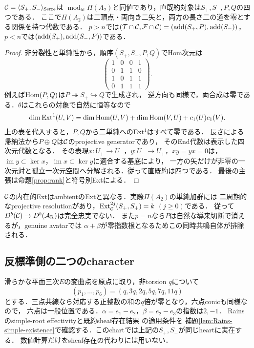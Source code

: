 \begin{proposition}[二根の全有限長対象]\label{prop:A2category}
$\mathcal C=\langle S_+,S_-\rangle_{\mathrm{Serre}}$は
$\operatorname{mod}_{\mathrm{fd}}\Pi(A_2)$と同値であり，直既約対象は$S_+,S_-,P,Q$の四つである．
ここで$\Pi(A_2)$は二頂点・両向き二矢と，両方の長さ二の道を零とする関係を持つ代数である．
$p>n$では$(\mathcal T\cap\mathcal C,\mathcal F\cap\mathcal C)=(\operatorname{add}(S_+,P),\operatorname{add}(S_-))$，
$p<n$では$(\operatorname{add}(S_+),\operatorname{add}(S_-,P))$である．
\end{proposition}
\begin{proof}
非分裂性と単純性から，順序$(S_+,S_-,P,Q)$でHom次元は
\[
\begin{pmatrix}
1&0&0&1\\0&1&1&0\\1&0&1&1\\0&1&1&1
\end{pmatrix}.
\]
例えば$\operatorname{Hom}(P,Q)$は$P\twoheadrightarrow S_+\hookrightarrow Q$で生成され，
逆方向も同様で，両合成は零である．$\theta$はこれらの対象で自然に恒等なので
\[
\dim\operatorname{Ext}^1(U,V)=\dim\operatorname{Hom}(U,V)+\dim\operatorname{Hom}(V,U)+c_1(U)c_1(V).
\]
上の表を代入すると，$P,Q$から二単純へのExt$^1$はすべて零である．
長さによる帰納法から$P\oplus Q$は$\mathcal C$のprojective generatorであり，
そのEnd代数は表示した四次元代数となる．
その表現$x:U_+\to U_-$，$y:U_-\to U_+$，$xy=yx=0$は，
$\operatorname{im}y\subset\ker x$，$\operatorname{im}x\subset\ker y$に適合する基底により，
一方の矢だけが非零の一次元対と孤立一次元空間へ分解される．従って直既約は四つである．
最後の主張は命題\ref{prop:rank}と符号別Extによる．
\end{proof}

$\mathcal C$の内在的ExtはambientのExtと異なる．実際$\Pi(A_2)$の単純加群には
二周期的なprojective resolutionがあり，$\operatorname{Ext}^{2j}_{\mathcal C}(S_+,S_+)=k$ $(j\ge0)$である．
従って$D^b(\mathcal C)\to D^b(\mathcal A_{\mathrm R})$は完全忠実でない．
また$p=n$なら$P$は自然な導来切断で消えるが，genuine avatarでは
$\alpha+\beta$が零指数根となるためこの同時共鳴自体が排除される．

\subsection{反標準側の二つのcharacter}
\begin{example}[実在する指数$(2,-1)$]
滑らかな平面三次$E$の変曲点を原点に取り，非torsion $q$について
\[
(p_1,\ldots,p_6)=(q,3q,2q,5q,7q,11q)
\]
とする．三点共線なら対応する正整数の和の$q$倍が零となり，六点conicも同様なので，
六点は一般位置である．$\alpha=e_1-e_2$，$\beta=e_2-e_3$の指数は$2,-1$．
Rainsのsimple-root effectivityと既約sheaf存在結果
\cite[\S4]{Filtered}\cite[\S11, p.~141]{Rains}の適用条件を
補題\ref{lem:Rains-simple-existence}で確認する．このchartでは上記の$S_+,S_-$が同じheartに実在する．
数値計算だけをsheaf存在の代わりには用いない．
\end{example}

